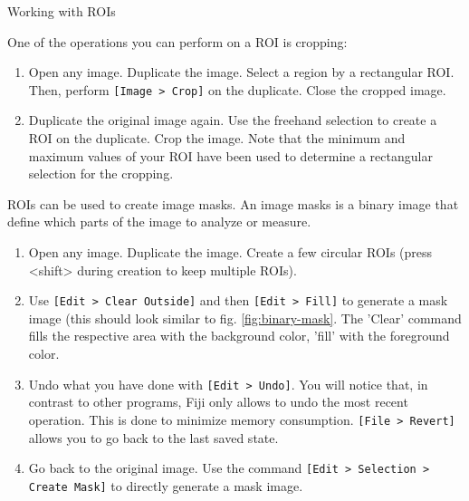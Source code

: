 \begin{taskbox}{Working with ROIs}

One of the operations you can perform on a ROI is cropping:
\begin{enumerate}
	\item Open any image. Duplicate the image. Select a region by a rectangular ROI. Then, perform \texttt{[Image > Crop]} on the duplicate. Close the cropped image.
	\item Duplicate the original image again. Use the freehand selection to create a ROI on the duplicate. Crop the image. Note that the minimum and maximum values of your ROI have been used to determine a rectangular selection for the cropping.
\end{enumerate}

ROIs can be used to create image masks. An image masks is a binary image that define which parts of the image to analyze or measure.

\begin{enumerate}
	\item Open any image. Duplicate the image. Create a few circular ROIs (press <shift> during creation to keep multiple ROIs). 
	\item Use \texttt{[Edit > Clear Outside]} and then \texttt{[Edit > Fill]} to generate a mask image (this should look similar to fig. \ref{fig:binary-mask}. The 'Clear' command fills the respective area with the background color, 'fill' with the foreground color.
	
	\begin{minipage}[t]{\linewidth}
		\begin{center}
		\medskip
		\label{fig:binary-mask}
		\end{center}
	\end{minipage}
	
	\item Undo what you have done with \texttt{[Edit > Undo]}. You will notice that, in contrast to other programs, Fiji only allows to undo the most recent operation. This is done to minimize memory consumption. \texttt{[File > Revert]} allows you to go back to the last saved state.
	\item Go back to the original image. Use the command \texttt{[Edit > Selection > Create Mask]} to directly generate a mask image.
\end{enumerate}


\end{taskbox}
